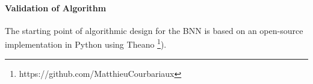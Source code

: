 


\paragraph{Validation of Algorithm}
The starting point of algorithmic design for the BNN is based on an open-source implementation in Python using Theano \footnote{https://github.com/MatthieuCourbariaux}). 

